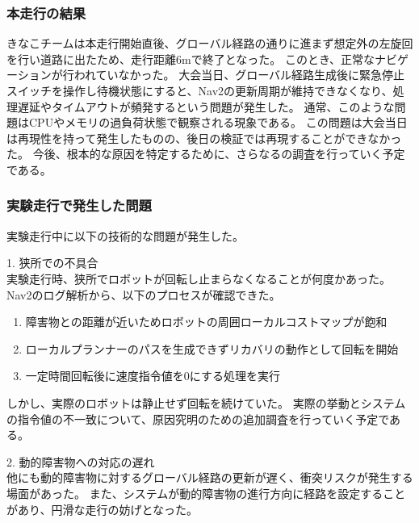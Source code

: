 \subsubsection{本走行の結果}
きなこチームは本走行開始直後、グローバル経路の通りに進まず想定外の左旋回を行い道路に出たため、走行距離6mで終了となった。
このとき、正常なナビゲーションが行われていなかった。
大会当日、グローバル経路生成後に緊急停止スイッチを操作し待機状態にすると、Nav2の更新周期が維持できなくなり、処理遅延やタイムアウトが頻発するという問題が発生した。
通常、このような問題はCPUやメモリの過負荷状態で観察される現象である。
この問題は大会当日は再現性を持って発生したものの、後日の検証では再現することができなかった。
今後、根本的な原因を特定するために、さらなるの調査を行っていく予定である。

\subsubsection{実験走行で発生した問題}
実験走行中に以下の技術的な問題が発生した。

1. 狭所での不具合\\
実験走行時、狭所でロボットが回転し止まらなくなることが何度かあった。
Nav2のログ解析から、以下のプロセスが確認できた。

\begin{enumerate}
  \item 障害物との距離が近いためロボットの周囲ローカルコストマップが飽和
  \item ローカルプランナーのパスを生成できずリカバリの動作として回転を開始
  \item  一定時間回転後に速度指令値を0にする処理を実行
\end{enumerate}

しかし、実際のロボットは静止せず回転を続けていた。
実際の挙動とシステムの指令値の不一致について、原因究明のための追加調査を行っていく予定である。

2. 動的障害物への対応の遅れ\\
他にも動的障害物に対するグローバル経路の更新が遅く、衝突リスクが発生する場面があった。
また、システムが動的障害物の進行方向に経路を設定することがあり、円滑な走行の妨げとなった。